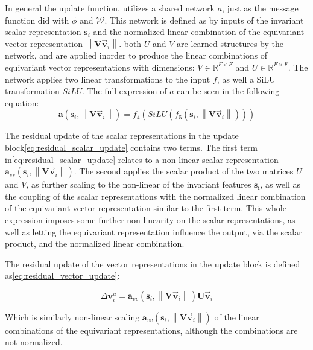 In general the update function, utilizes a shared network $a$, just as the message function did with $\phi$ and $\mathcal{W}$.
This network is defined as by inputs of the invariant scalar representation $\mathbf{s}_{i}$ and the normalized linear combination of
the equivariant vector representation $\left \| \mathbf{V}\vec{\mathbf{v}}_{i} \right \|$. both $U$ and $V$ are learned structures
by the network, and are applied inorder to produce the linear combinations of equivariant vector representations with dimensions:
$V \in \mathbb{R}^{F \times F}$ and $U \in \mathbb{R}^{F \times F}$.
The network applies two linear transformations
to the input $f$, as well a SiLU transformation $SiLU$. The full expression of $a$ can be seen in the following equation:
\begin{equation}\label{eq:a}
    \mathbf{a}(\mathbf{s}_{i}, \left \| \mathbf{V}\vec{\mathbf{v}}_{i} \right \|) = f_{4}(SiLU(f_{5}(\mathbf{s}_{i}, \left \| \mathbf{V}\vec{\mathbf{v}}_{i} \right \|)))
\end{equation}

The residual update of the scalar representations in the update block\ref{eq:residual_scalar_update} contains two terms.
The first term in\ref{eq:residual_scalar_update} relates to a non-linear scalar representation $\mathbf{a}_{ss} \left ( \mathbf{s}_{i}, \left \| \mathbf{V}\vec{\mathbf{v}}_{i} \right \| \right )$.
The second applies the scalar product of the two matrices $U$ and $V$, as further scaling to the non-linear of the invariant features $\mathbf{s_{i}}$,
as well as the coupling of the scalar representations with the normalized linear combination of the equivariant vector representation similar to the first
term. This whole expression imposes some further non-linearity on the scalar representations, as well as letting the equivariant representation
influence the output, via the scalar product, and the normalized linear combination.

The residual update of the vector representations in the update block is defined as\ref{eq:residual_vector_update}:

\begin{equation}\label{eq:residual_vector_update}
    \Delta \mathbf{v}_{i}^{u}= \mathbf{a}_{vv} \left ( \mathbf{s}_{i}, \left \| \mathbf{V}\vec{\mathbf{v}}_{i} \right \| \right ) \mathbf{U}\vec{\mathbf{v}}_{i}
\end{equation}

Which is similarly non-linear scaling $\mathbf{a}_{vv} \left ( \mathbf{s}_{i}, \left \| \mathbf{V}\vec{\mathbf{v}}_{i} \right \| \right )$
of the linear combinations of the equivariant representations, although the combinations are not normalized.

